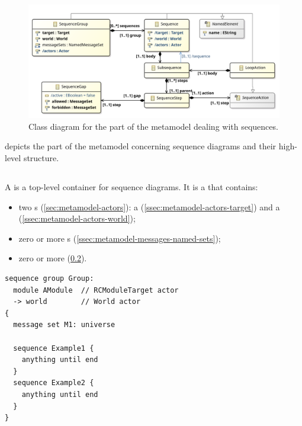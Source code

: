 \begin{figure}
	\centering
	\includegraphics[width=\textwidth]{diagrams/Sequences}
	\caption{Class diagram for the part of the \langname{} metamodel dealing with sequences.}
	\label{fig:metamodel-sequences}
\end{figure}

 depicts the part of the metamodel concerning
sequence diagrams and their high-level structure.

\subsection{\msequencegroup}

A \msequencegroup{} is a top-level container for sequence diagrams.
It is a \mnamedelement{} that contains:

\begin{itemize}
\item
  two \mactor s (\cref{sec:metamodel-actors}):
  a \mtarget{} (\cref{ssec:metamodel-actors-target})
  and a \mworld{} (\cref{ssec:metamodel-actors-world});
\item
  zero or more \mnamedmessageset{}s (\cref{ssec:metamodel-messages-named-sets});
\item
  zero or more \msequence{} (\cref{ssec:metamodel-sequences-sequences}).
\end{itemize}

\begin{lstlisting}[style=Example]
sequence group Group:
  module AModule  // RCModuleTarget actor
  -> world        // World actor
{
  message set M1: universe
  
  sequence Example1 {
    anything until end
  }
  sequence Example2 {
    anything until end
  }
}
\end{lstlisting}

\subsection{\msequence}\label{ssec:metamodel-sequences-sequences}

